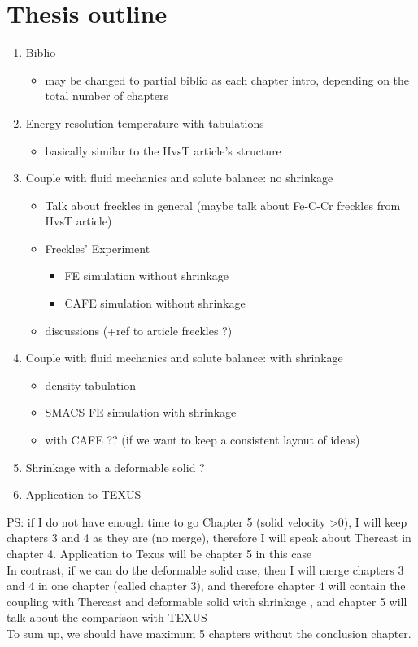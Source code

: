 \documentclass[10pt,a4paper]{article}
\begin{document}
\section*{Thesis outline}

\begin{enumerate}
\item Biblio
\begin{itemize}
\item may be changed to partial biblio as each chapter intro, depending on the total number of chapters
\end{itemize}

\item Energy resolution temperature with tabulations
\begin{itemize}
\item basically similar to the HvsT article’s structure
\end{itemize}

\item Couple with fluid mechanics and solute balance: no shrinkage
\begin{itemize}
\item Talk about freckles in general (maybe talk about Fe-C-Cr freckles from HvsT article)
\item	Freckles’ Experiment 
\begin{itemize}
\item FE simulation without shrinkage
\item CAFE simulation without shrinkage
\end{itemize}

\item discussions (+ref to article freckles ?)
\end{itemize}

\item Couple with fluid mechanics and solute balance: with shrinkage
\begin{itemize}
\item density tabulation
\item SMACS FE simulation with shrinkage
\item with CAFE ?? (if we want to keep a consistent layout of ideas)
\end{itemize}

\item Shrinkage with a deformable solid ?
\item Application to TEXUS \\
\end{enumerate}

PS: if I do not have enough time to go Chapter 5 (solid velocity >0), I will keep chapters 3 and 4 as they are (no merge), therefore I will speak about Thercast in chapter 4. Application to Texus will be chapter 5 in this case \\
In contrast, if we can do the deformable solid case, then I will merge chapters 3 and 4 in one chapter (called chapter 3), and therefore chapter 4 will contain the coupling with Thercast and deformable solid with shrinkage , and chapter 5 will talk about the comparison with TEXUS \\
To sum up, we should have maximum 5 chapters without the conclusion chapter.
\end{document}
